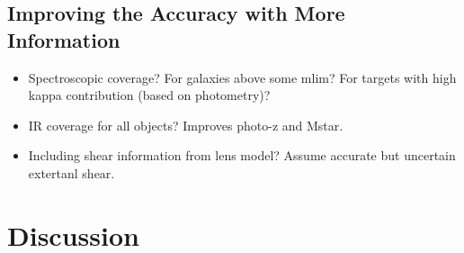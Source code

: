 \documentclass[useAMS,usenatbib]{mn2e}
\begin{document}
{%

\subsection{Improving the Accuracy with More Information}
\label{sec:Dt:selection} 

\begin{itemize}
\item Spectroscopic coverage? For galaxies above some mlim? For targets with
high kappa contribution (based on photometry)?
\item IR coverage for all objects? Improves photo-z and Mstar.
\item Including shear information from lens model? Assume accurate but
uncertain extertanl shear.
\end{itemize}



}

\section{Discussion}
\label{sec:discuss}
\end{document}
